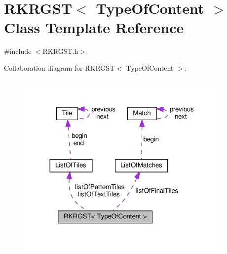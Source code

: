 \hypertarget{classRKRGST}{\section{R\+K\+R\+G\+S\+T$<$ Type\+Of\+Content $>$ Class Template Reference}
\label{classRKRGST}
}


{\ttfamily \#include $<$R\+K\+R\+G\+S\+T.\+h$>$}



Collaboration diagram for R\+K\+R\+G\+S\+T$<$ Type\+Of\+Content $>$\+:\nopagebreak
\begin{figure}[H]
\begin{center}
\leavevmode
\includegraphics[width=300pt]{classRKRGST__coll__graph}
\end{center}
\end{figure}
